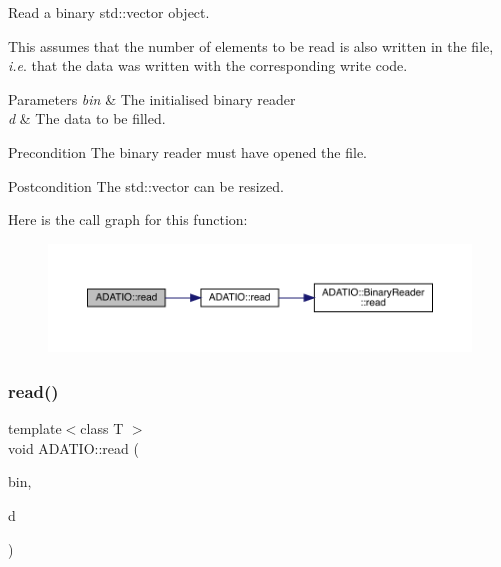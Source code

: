 Read a binary std\+::vector object. 

This assumes that the number of elements to be read is also written in the file, {\itshape i.\+e}. that the data was written with the corresponding write code. 
\begin{DoxyParams}{Parameters}
{\em bin} & The initialised binary reader \\
\hline
{\em d} & The data to be filled.\\
\hline
\end{DoxyParams}
\begin{DoxyPrecond}{Precondition}
The binary reader must have opened the file. 
\end{DoxyPrecond}
\begin{DoxyPostcond}{Postcondition}
The std\+::vector can be resized. 
\end{DoxyPostcond}
Here is the call graph for this function\+:
\nopagebreak
\begin{figure}[H]
\begin{center}
\leavevmode
\includegraphics[width=350pt]{d0/dba/namespaceADATIO_a6f8814a83922a0b41bf9a25627b5dcfd_cgraph}
\end{center}
\end{figure}
\mbox{\label{namespaceADATIO_a6b74b694d784ffa233957d276d10528d}} 
\subsubsection{\texorpdfstring{read()}{read()}\hspace{0.1cm}{\footnotesize\ttfamily [25/28]}}
{\footnotesize\ttfamily template$<$class T $>$ \\
void A\+D\+A\+T\+I\+O\+::read (\begin{DoxyParamCaption}\item[{\mbox{\hyperlink{classADATIO_1_1BinaryReader}{Binary\+Reader}} \&}]{bin,  }\item[{std\+::list$<$ T $>$ \&}]{d }\end{DoxyParamCaption})\hspace{0.3cm}{\ttfamily [inline]}}



